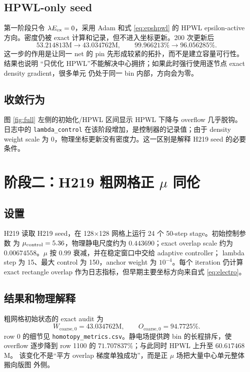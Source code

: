 \documentclass[UTF8,a4paper,11pt]{ctexrep}
\begin{document}
\section{HPWL-only seed}
第一阶段只令 $\lambda E_{\rm ex}=0$，采用 Adam 和式 \eqref{eq:epshpwl} 的 HPWL
epsilon-active 方向。密度仍被 exact 计算和记录，但不进入坐标更新。200 次更新后
\[
  53.214813\text{M}\longrightarrow43.034762\text{M},
  \qquad
  99.966213\%\longrightarrow96.056285\%.
\]
这一步的作用是让同一 net 的 pin 先形成较紧的拓扑，而不是建立容量可行性。结果也说明
“只优化 HPWL”不能解决中心拥挤；如果此时强行使用逐节点 exact density gradient，很多单元
仍处于同一 bin 内部，方向会为零。

\section{收敛行为}
图 \ref{fig:full} 左侧的初始化/HPWL 区间显示 HPWL 下降与 overflow 几乎脱钩。
日志中的 \texttt{lambda\_control} 在该阶段增加，是控制器的记录值；由于 density weight
scale
为 0，物理坐标更新没有密度力。这一区别是解释 H219 seed 的必要条件。

\chapter{\texorpdfstring{阶段二：H219 粗网格正 $\mu$ 同伦}{阶段二：H219 粗网格正 mu 同伦}}

\section{设置}
H219 读取 H219 seed，在 128$\times$128 网格上运行 24 个 50-step stage。初始控制参数
为 $\mu_{\rm control}=5.36$，物理静电尺度约为 $0.443690$；exact overlap scale
约为 $0.00674558$。$\mu$ 按 $0.99$ 衰减，并在稳定窗口中交给 adaptive controller；
lambda step 为 15、最大 control 为 150，anchor weight 为 $10^{-4}$。每个 iteration
仍计算 exact rectangle overlap 作为日志指标，但早期主要坐标方向来自式 \eqref{eq:electro}。

\section{结果和物理解释}
粗网格初始状态的 exact audit 为
\[
  W_{\mathrm{coarse},0}=43.034762\text{M},\qquad
  O_{\mathrm{coarse},0}=94.7725\%.
\]
row 0 的细节见 \texttt{homotopy\_metrics.csv}。静电场提供跨 bin 的长程排斥，使 overflow
逐步降到 row 1100 的 $71.707837\%$；与此同时 HPWL 上升至 $60.617468$M。
该变化不是“平方 overlap 梯度单独成功”，而是正 $\mu$ 场把大量中心单元整体搬向版图
外侧。
\end{document}
